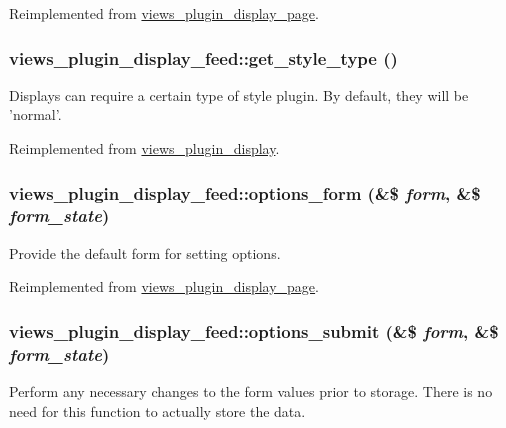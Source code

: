 Reimplemented from \hyperlink{classviews__plugin__display__page_a943b71fc873e5d09f548b69ba314b674}{views\_\-plugin\_\-display\_\-page}.\hypertarget{classviews__plugin__display__feed_a9a7886409056fe5906021a70d2f41c14}{
\subsubsection[{get\_\-style\_\-type}]{\setlength{\rightskip}{0pt plus 5cm}views\_\-plugin\_\-display\_\-feed::get\_\-style\_\-type ()}}
\label{classviews__plugin__display__feed_a9a7886409056fe5906021a70d2f41c14}
Displays can require a certain type of style plugin. By default, they will be 'normal'. 

Reimplemented from \hyperlink{classviews__plugin__display_a03f77cb37c3c3219d031c153aa59d20e}{views\_\-plugin\_\-display}.\hypertarget{classviews__plugin__display__feed_abe0a41d577b52de992279986d6c8c2d9}{
\subsubsection[{options\_\-form}]{\setlength{\rightskip}{0pt plus 5cm}views\_\-plugin\_\-display\_\-feed::options\_\-form (\&\$ {\em form}, \/  \&\$ {\em form\_\-state})}}
\label{classviews__plugin__display__feed_abe0a41d577b52de992279986d6c8c2d9}
Provide the default form for setting options. 

Reimplemented from \hyperlink{classviews__plugin__display__page_aa8267a4774b92a7b47a3768ac98aac36}{views\_\-plugin\_\-display\_\-page}.\hypertarget{classviews__plugin__display__feed_ab7cca15934456ddb26045f03483899fb}{
\subsubsection[{options\_\-submit}]{\setlength{\rightskip}{0pt plus 5cm}views\_\-plugin\_\-display\_\-feed::options\_\-submit (\&\$ {\em form}, \/  \&\$ {\em form\_\-state})}}
\label{classviews__plugin__display__feed_ab7cca15934456ddb26045f03483899fb}
Perform any necessary changes to the form values prior to storage. There is no need for this function to actually store the data. 

